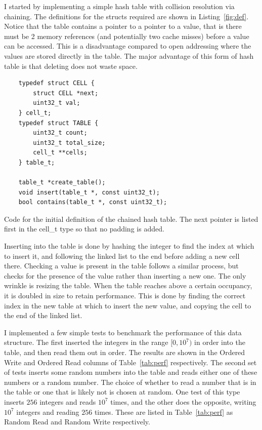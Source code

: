\documentclass[12pt]{article}
\begin{document}
I started by implementing a simple hash table with collision resolution via chaining. 
The definitions for the structs required are shown in Listing~\ref{fig:def}. Notice that
the table contains a pointer to a pointer to a value, that is there must be 2 memory 
references (and potentially two cache misses) before a value can be accessed. This is a
disadvantage compared to open addressing where the values are stored directly in the table.
The major advantage of this form of hash table is that deleting does not waste space.
\begin{listing}
    \centering
    \begin{minipage}[t]{.5\textwidth}
    \begin{verbatim}
    typedef struct CELL {
        struct CELL *next;
        uint32_t val;
    } cell_t;
    typedef struct TABLE {
        uint32_t count;
        uint32_t total_size;
        cell_t **cells;
    } table_t;
    
    table_t *create_table();
    void insert(table_t *, const uint32_t);
    bool contains(table_t *, const uint32_t);
\end{verbatim}
\end{minipage}
\caption{Code for the initial definition of the chained hash table. The next pointer is listed first in the cell\_t
type so that no padding is added.}
\label{fig:def}
\end{listing}

Inserting into the table is done by hashing the integer to find the index at which to insert it, and following the linked
list to the end before adding a new cell there. Checking a value is present in the table follows a similar process, but
checks for the presence of the value rather than inserting a new one. The only wrinkle is resizing the table. When the 
table reaches above a certain occupancy, it is doubled in size to retain performance. This is done by finding the 
correct index in the new table at which to insert the new value, and copying the cell to the end of the linked list.

I implemented a few simple tests to benchmark the performance of this data structure. The first inserted the integers
in the range $[0, 10^7)$ in order into the table, and then read them out in order. The results are shown in the 
Ordered Write and Ordered Read columns of Table~\ref{tab:perf} respectively. The second set of tests inserts some random
numbers into the table and reads either one of these numbers or a random number. The choice of whether to read a number 
that is in the table or one that is likely not is chosen at random. One test of this type inserts $256$ integers 
and reads $10^7$ times, and the other does the opposite, writing $10^7$ integers and reading $256$ times. These are 
listed in Table~\ref{tab:perf} as Random Read and Random Write respectively. 
\end{document}
